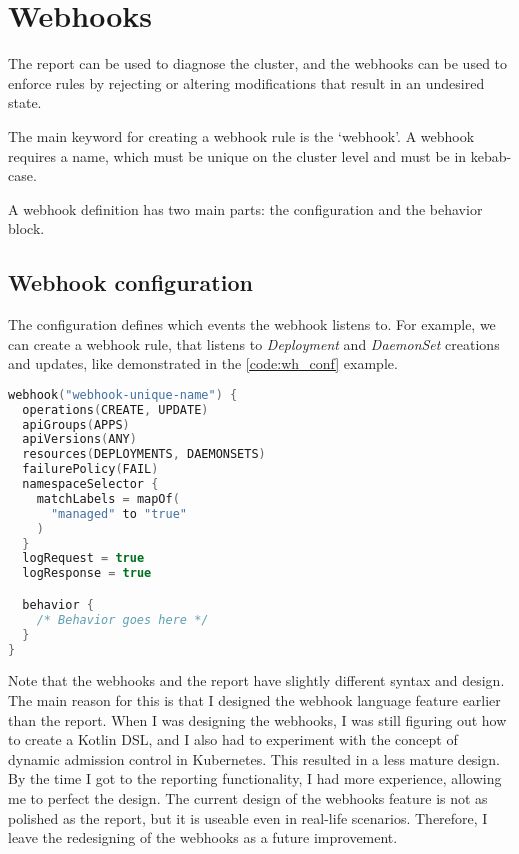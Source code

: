 \section{Webhooks}

The report can be used to diagnose the cluster, and the webhooks can be used to enforce rules by rejecting or altering modifications that result in an undesired state.

The main keyword for creating a webhook rule is the `webhook'. A webhook requires a name, which must be unique on the cluster level and must be in kebab-case.

A webhook definition has two main parts: the configuration and the behavior block.

\subsection{Webhook configuration}

The configuration defines which events the webhook listens to. For example, we can create a webhook rule, that listens to \emph{Deployment} and \emph{DaemonSet} creations and updates, like demonstrated in the \ref{code:wh_conf} example.

\begin{lstlisting}[caption={Webhook configuration},language=Kotlin,label=code:wh_conf]
webhook("webhook-unique-name") {
  operations(CREATE, UPDATE)
  apiGroups(APPS)
  apiVersions(ANY)
  resources(DEPLOYMENTS, DAEMONSETS)
  failurePolicy(FAIL)
  namespaceSelector {
    matchLabels = mapOf(
      "managed" to "true"
    )
  }
  logRequest = true
  logResponse = true

  behavior {
    /* Behavior goes here */
  }
}
\end{lstlisting}

Note that the webhooks and the report have slightly different syntax and design. The main reason for this is that I designed the webhook language feature earlier than the report. When I was designing the webhooks, I was still figuring out how to create a Kotlin DSL, and I also had to experiment with the concept of dynamic admission control in Kubernetes. This resulted in a less mature design. By the time I got to the reporting functionality, I had more experience, allowing me to perfect the design. The current design of the webhooks feature is not as polished as the report, but it is useable even in real-life scenarios. Therefore, I leave the redesigning of the webhooks as a future improvement.

